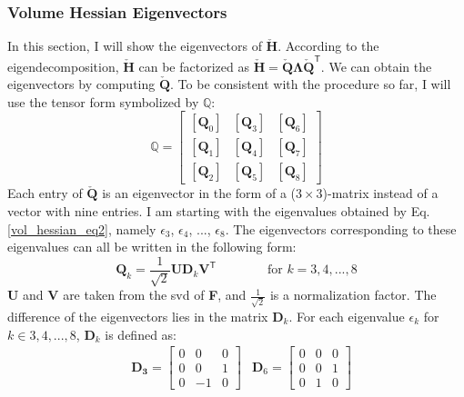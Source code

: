 {{{\subsubsection{Volume Hessian Eigenvectors}
In this section, I will show the eigenvectors of $\mathbf{\check{H}}$. According to the eigendecomposition, $\mathbf{\check{H}}$ can be factorized as $\mathbf{\check{H}} = \mathbf{\check{Q}}\mathbf{\Lambda}\mathbf{\check{Q}}^\mathsf{T}$. We can obtain the eigenvectors by computing $\mathbf{\check{Q}}$. To be consistent with the procedure so far, I will use the tensor form symbolized by $\mathbb{Q}$:
\[
\mathbb{Q} = \left[\begin{array}{ccc}{\left[\mathbf{Q}_0\right]} & {\left[\mathbf{Q}_3\right]} & {\left[\mathbf{Q}_6\right]} \\ {\left[\mathbf{Q}_1\right]} & {\left[\mathbf{Q}_4\right]} & {\left[\mathbf{Q}_7\right]} \\ {\left[\mathbf{Q}_2\right]} & {\left[\mathbf{Q}_5\right]} & {\left[\mathbf{Q}_8\right]} \end{array}\right]
\]
Each entry of $\mathbf{\check{Q}}$ is an eigenvector in the form of a ($3 \times 3$)-matrix instead of a vector with nine entries. I am starting with the eigenvalues obtained by Eq. \eqref{vol_hessian_eq2}, namely $\epsilon_3$, $\epsilon_4$, ..., $\epsilon_8$. The eigenvectors corresponding to these eigenvalues can all be written in the following form:
\begin{equation}\label{eq:eigenvectors_vhessian}
\mathbf{Q}_k = \frac{1}{\sqrt{2}} \mathbf{U} \mathbf{D}_k \mathbf{V}^\mathsf{T} \qquad \qquad \text{for } k = 3, 4, ..., 8
\end{equation}
\textbf{U} and \textbf{V} are taken from the \acrshort{svd} of \textbf{F}, and $\frac{1}{\sqrt{2}}$ is a normalization factor. The difference of the eigenvectors lies in the matrix $\mathbf{D}_k$. For each eigenvalue $\epsilon_k$ for $k \in {3,4,...,8}$, $\mathbf{D}_k$ is defined as:
\begin{align*}
&\mathbf{D_3} = \left[ \begin{matrix}
0 & 0 & 0 \\ 0 & 0 & 1 \\ 0 & -1 & 0 \end{matrix} \right] &\mathbf{D}_6 = \left[ \begin{matrix}
0 & 0 & 0 \\ 0 & 0 & 1 \\ 0 & 1 & 0 \end{matrix} \right]
 \\[0.5em]

\end{align*}}}}

